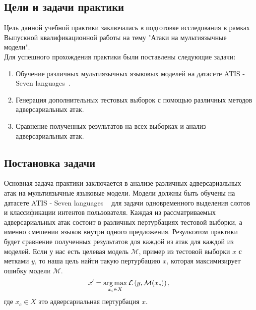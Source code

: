 \subsection{Цели и задачи практики}
Цель данной учебной практики заключалась в подготовке исследования в рамках Выпускной квалификационной работы на тему "Атаки на мультиязычные модели". \\
Для успешного прохождения практики были поставлены следующие задачи:
\begin{enumerate}
    \item Обучение различных мультиязычных языковых моделей на датасете ATIS - Seven languages~\cite{Xu2020EndtoEndSA}.
    \item Генерация дополнительных тестовых выборок с помощью различных методов адверсариальных атак.
    \item Сравнение полученных результатов на всех выборках и анализ адверсариальных атак.
\end{enumerate}

\subsection{Постановка задачи}
Основная задача практики заключается в анализе различных адверсариальных атак на мультиязычные языковые модели.
Модели должны быть обучены на датасете ATIS - Seven languages ~\cite{Xu2020EndtoEndSA} для задачи одновременного выделения слотов и классификации интентов пользователя.
\newline
Каждая из рассматриваемых адверсариальных атак состоит в различных пертурбациях тестовой выборки, а именно смешении языков внутри одного предложения.
Результатом практики будет сравнение полученных результатов для каждой из атак для каждой из моделей.
\newline
Если у нас есть целевая модель $\mathcal{M}$, пример из тестовой выборки $x$ с метками $y$, то наша цель найти такую пертурбацию $x$, которая максимизирует ошибку модели $\mathcal{M}$.
\[
    x' = \operatorname*{arg\,max}\limits_{x_c \in X} \mathcal{L}\left( y, \mathcal{M}(x_c) \right),
\]
где $x_c \in X$ это адверсариальная пертурбация $x$.

